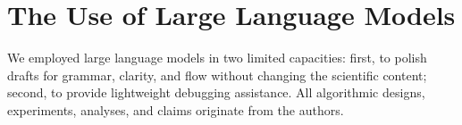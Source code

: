 \documentclass{article} %
\begin{document}
\vspace{1cm}



\section*{The Use of Large Language Models}
We employed large language models in two limited capacities: first, to polish drafts for grammar, clarity, and flow without changing the scientific content; second, to provide lightweight debugging assistance. All algorithmic designs, experiments, analyses, and claims originate from the authors.
\end{document}
